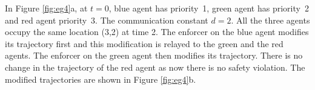 \begin{eg}
In Figure \ref{fig:eg4}a, at $t=0$, blue agent has priority~1, green agent has priority~2 and red agent priority~3. The communication constant $d = 2$. All the three agents occupy the same location (3,2) at time 2. The enforcer on the blue agent modifies its trajectory first and this modification is relayed to the green and the red agents. The enforcer on the green agent then modifies its trajectory. There is no change in the trajectory of the red agent as now there is no safety violation. The modified trajectories are shown in Figure \ref{fig:eg4}b.
\end{eg}



